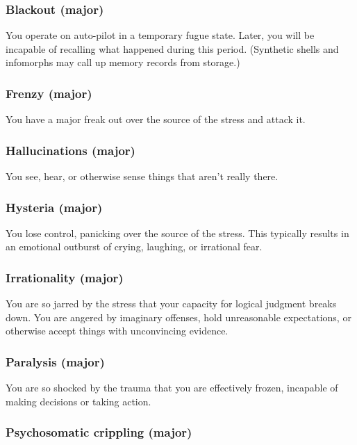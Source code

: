 \subsubsection{Blackout (major)} 

You operate on auto-pilot in a temporary fugue state. Later, you will be incapable of recalling what happened during this period. (Synthetic shells and infomorphs may call up memory records from storage.) 

\subsubsection{Frenzy (major)} 

You have a major freak out over the source of the stress and attack it. 

\subsubsection{Hallucinations (major)} 

You see, hear, or otherwise sense things that aren’t really there. 

\subsubsection{Hysteria (major)} 

You lose control, panicking over the source of the stress. This typically results in an emotional outburst of crying, laughing, or irrational fear. 

\subsubsection{Irrationality (major)} 

You are so jarred by the stress that your capacity for logical judgment breaks down. You are angered by imaginary offenses, hold unreasonable expectations, or otherwise accept things with unconvincing evidence. 

\subsubsection{Paralysis (major)} 

You are so shocked by the trauma that you are effectively frozen, incapable of making decisions or taking action. 

\subsubsection{Psychosomatic crippling (major)} 

